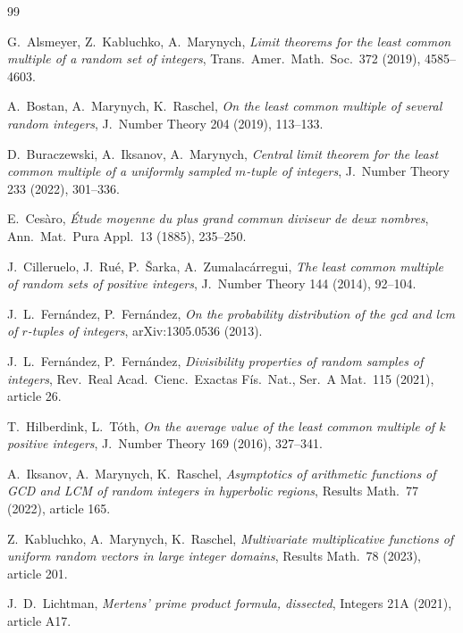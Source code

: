 \documentclass[11pt]{article}
\theoremstyle{remark}
\begin{document}
\begin{thebibliography}{99}

G.~Alsmeyer, Z.~Kabluchko, A.~Marynych, \emph{Limit theorems for the least common multiple of a random set of integers}, Trans.\ Amer.\ Math.\ Soc.\ 372 (2019), 4585--4603.

A.~Bostan, A.~Marynych, K.~Raschel, \emph{On the least common multiple of several random integers}, J.\ Number Theory 204 (2019), 113--133.

D.~Buraczewski, A.~Iksanov, A.~Marynych, \emph{Central limit theorem for the least common multiple of a uniformly sampled $m$-tuple of integers}, J.\ Number Theory 233 (2022), 301--336.

E.~Ces\`aro, \emph{\'Etude moyenne du plus grand commun diviseur de deux nombres}, Ann.\ Mat.\ Pura Appl.\ 13 (1885), 235--250.

J.~Cilleruelo, J.~Ru\'e, P.~\v{S}arka, A.~Zumalac\'arregui, \emph{The least common multiple of random sets of positive integers}, J.\ Number Theory 144 (2014), 92--104.

J.~L.~Fern\'andez, P.~Fern\'andez, \emph{On the probability distribution of the gcd and lcm of $r$-tuples of integers}, arXiv:1305.0536 (2013).

J.~L.~Fern\'andez, P.~Fern\'andez, \emph{Divisibility properties of random samples of integers}, Rev.\ Real Acad.\ Cienc.\ Exactas F\'is.\ Nat., Ser.\ A Mat.\ 115 (2021), article 26.

T.~Hilberdink, L.~T\'oth, \emph{On the average value of the least common multiple of $k$ positive integers}, J.\ Number Theory 169 (2016), 327--341.

A.~Iksanov, A.~Marynych, K.~Raschel, \emph{Asymptotics of arithmetic functions of GCD and LCM of random integers in hyperbolic regions}, Results Math.\ 77 (2022), article 165.

Z.~Kabluchko, A.~Marynych, K.~Raschel, \emph{Multivariate multiplicative functions of uniform random vectors in large integer domains}, Results Math.\ 78 (2023), article 201.

J.~D.~Lichtman, \emph{Mertens' prime product formula, dissected}, Integers 21A (2021), article A17.


\end{thebibliography}
\end{document}
